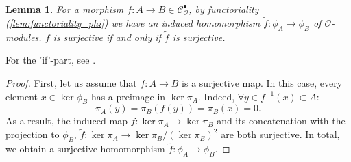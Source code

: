 \documentclass{article}
\theoremstyle{plain}%
\newtheorem{lemma}[theorem]{Lemma}
\theoremstyle{definition}
\theoremstyle{remark}
\newcommand{\cob}{\mathcal{C}_\mathcal{O}^\bullet}
\begin{document}
\begin{lemma}\label{lem:surjectivity_phi}
    For a morphism \(f\colon A \to B \in \cob\), by functoriality (\cref{lem:functoriality_phi}) we
    have an induced homomorphism \(\tilde f\colon\phi_A \to \phi_B\) of \(\mathcal{O}\)-modules.
    \(f\) is surjective if and only if \(\tilde f\) is surjective.
\end{lemma}
For the 'if'-part, see \cites[lemma 5.5]{Darmon1995}[theorem 8.4]{Matsumura1986}%
[ch. II, lemma 7.4]{Hartshorne1977}[\href{https://stacks.math.columbia.edu/tag/090T}{tag 090T}]{stacks-project}.
\begin{proof}
    First, let us assume that \(f\colon A \to B\) is a surjective map.
    In this case, every element \(x \in \ker \phi_B\) has a preimage in \(\ker \pi_A\). 
    Indeed, \(\forall y \in f^{-1}(x)\subset A\colon\)
    \[
        \pi_A(y) = \pi_B(f(y)) = \pi_B(x) = 0.
    \]
    As a result, the induced map \(f\colon \ker \pi_A \to \ker \pi_B\) and its concatenation with
    the projection to \(\phi_B\), \(\tilde f\colon \ker \pi_A \to \ker \pi_B/(\ker \pi_B)^2\) are both surjective.
    In total, we obtain a surjective homomorphism \(\tilde f\colon \phi_A \to \phi_B\).
    

\end{proof}
\end{document}
